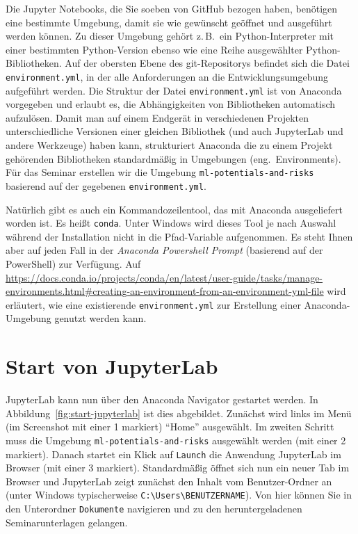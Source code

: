 \documentclass{tufte-handout}
\begin{document}
Die Jupyter Notebooks, die Sie soeben von GitHub bezogen haben, benötigen eine bestimmte Umgebung, damit sie wie gewünscht geöffnet und ausgeführt werden können.
Zu dieser Umgebung gehört z.\,B.\ ein Python-Interpreter mit einer bestimmten Python-Version ebenso wie eine Reihe ausgewählter Python-Bibliotheken.
Auf der obersten Ebene des git-Repositorys befindet sich die Datei \texttt{environment.yml}, in der alle Anforderungen an die Entwicklungsumgebung aufgeführt werden.
Die Struktur der Datei \texttt{environment.yml} ist von Anaconda vorgegeben und erlaubt es, die Abhängigkeiten von Bibliotheken automatisch aufzulösen.
Damit man auf einem Endgerät in verschiedenen Projekten unterschiedliche Versionen einer gleichen Bibliothek (und auch JupyterLab und andere Werkzeuge) haben kann,
strukturiert Anaconda die zu einem Projekt gehörenden Bibliotheken standardmäßig in Umgebungen (eng.\ Environments).
Für das Seminar erstellen wir die Umgebung
\texttt{ml-potentials-and-risks}
basierend auf der gegebenen \texttt{environment.yml}.

Natürlich gibt es auch ein Kommandozeilentool, das mit Anaconda ausgeliefert worden ist.
Es heißt \texttt{conda}.
Unter Windows wird dieses Tool je nach Auswahl während der Installation nicht in die Pfad-Variable aufgenommen.
Es steht Ihnen aber auf jeden Fall in der
\emph{Anaconda Powershell Prompt} (basierend auf der PowerShell)
zur Verfügung.
Auf
\url{https://docs.conda.io/projects/conda/en/latest/user-guide/tasks/manage-environments.html#creating-an-environment-from-an-environment-yml-file}
wird erläutert, wie eine existierende \texttt{environment.yml} zur Erstellung einer Anaconda-Umgebung genutzt werden kann.

\section{Start von JupyterLab}

JupyterLab kann nun über den Anaconda Navigator gestartet werden.
In Abbildung~\ref{fig:start-jupyterlab} ist dies abgebildet.
Zunächst wird links im Menü
(im Screenshot mit einer 1 markiert)
\enquote{Home} ausgewählt.
Im zweiten Schritt muss die Umgebung
\texttt{ml-potentials-and-risks}
ausgewählt werden
(mit einer 2 markiert).
Danach startet ein Klick auf \texttt{Launch} die Anwendung JupyterLab im Browser
(mit einer 3 markiert).
Standardmäßig öffnet sich nun ein neuer Tab im Browser und JupyterLab zeigt zunächst den Inhalt vom Benutzer-Ordner an (unter Windows typischerweise \texttt{C:\textbackslash{}Users\textbackslash{}BENUTZERNAME}).
Von hier können Sie in den Unterordner \texttt{Dokumente} navigieren und zu den heruntergeladenen Seminarunterlagen gelangen.
\end{document}
